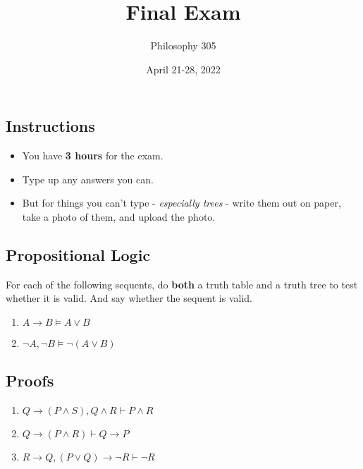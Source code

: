\documentclass[
  11pt,
]{article}
\title{Final Exam}
\author{Philosophy 305}
\date{April 21-28, 2022}
\providecommand{\tightlist}{%
  \setlength{\itemsep}{0pt}\setlength{\parskip}{0pt}}
\begin{document}
\maketitle

\hypertarget{instructions}{%
\subsection{Instructions}\label{instructions}}

\begin{itemize}
\tightlist
\item
  You have \textbf{3 hours} for the exam.
\item
  Type up any answers you can.
\item
  But for things you can't type - \emph{especially trees} - write them
  out on paper, take a photo of them, and upload the photo.
\end{itemize}

\hypertarget{propositional-logic}{%
\subsection{Propositional Logic}\label{propositional-logic}}

For each of the following sequents, do \textbf{both} a truth table and a
truth tree to test whether it is valid. And say whether the sequent is
valid.

\begin{enumerate}
\def\labelenumi{\arabic{enumi}.}
\tightlist
\item
  \(A \rightarrow B \vDash A \vee B\)
\item
  \(\neg A, \neg B \vDash \neg (A \vee B)\)
\end{enumerate}

\hypertarget{proofs}{%
\subsection{Proofs}\label{proofs}}

\begin{enumerate}
\def\labelenumi{\arabic{enumi}.}
\setcounter{enumi}{2}
\tightlist
\item
  \(Q \rightarrow (P \wedge S), Q \wedge R \vdash P \wedge R\)
\item
  \(Q \rightarrow (P \wedge R) \vdash Q \rightarrow P\)
\item
  \(R \rightarrow Q, (P \vee Q) \rightarrow \neg R \vdash \neg R\)
\end{enumerate}
\end{document}
